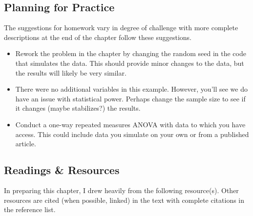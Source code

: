 \documentclass[
  11pt,
]{book}
\providecommand{\tightlist}{%
  \setlength{\itemsep}{0pt}\setlength{\parskip}{0pt}}
\begin{document}
\hypertarget{planning-for-practice-6}{%
\subsection{Planning for Practice}\label{planning-for-practice-6}}

The suggestions for homework vary in degree of challenge with more complete descriptions at the end of the chapter follow these suggestions.

\begin{itemize}
\tightlist
\item
  Rework the problem in the chapter by changing the random seed in the code that simulates the data. This should provide minor changes to the data, but the results will likely be very similar.
\item
  There were no additional variables in this example. However, you'll see we do have an issue with statistical power. Perhaps change the sample size to see if it changes (maybe stabilizes?) the results.
\item
  Conduct a one-way repeated measures ANOVA with data to which you have access. This could include data you simulate on your own or from a published article.
\end{itemize}

\hypertarget{readings-resources-6}{%
\subsection{Readings \& Resources}\label{readings-resources-6}}

In preparing this chapter, I drew heavily from the following resource(s). Other resources are cited (when possible, linked) in the text with complete citations in the reference list.
\end{document}
